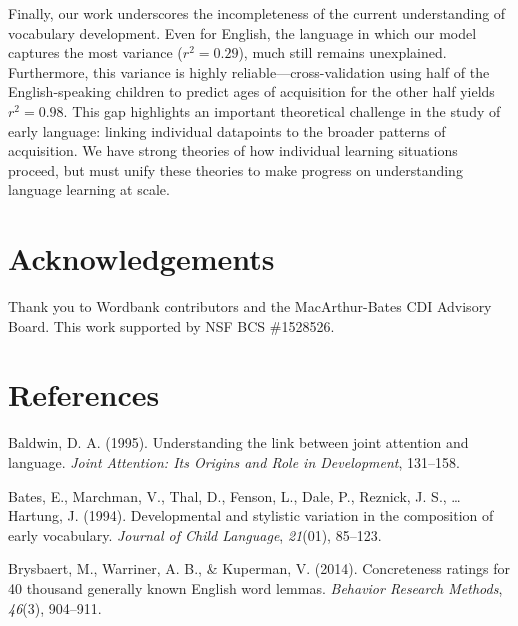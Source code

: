 \documentclass[10pt, letterpaper]{article}
\begin{document}
Finally, our work underscores the incompleteness of the current
understanding of vocabulary development. Even for English, the language
in which our model captures the most variance (\(r^2 = 0.29\)), much
still remains unexplained. Furthermore, this variance is highly
reliable---cross-validation using half of the English-speaking children
to predict ages of acquisition for the other half yields \(r^2 = 0.98\).
This gap highlights an important theoretical challenge in the study of
early language: linking individual datapoints to the broader patterns of
acquisition. We have strong theories of how individual learning
situations proceed, but must unify these theories to make progress on
understanding language learning at scale.

\vspace{1em}

\vspace{1em}

\section{Acknowledgements}\label{acknowledgements}

Thank you to Wordbank contributors and the MacArthur-Bates CDI Advisory
Board. This work supported by NSF BCS \#1528526.

\newpage

\section{References}\label{references}

\setlength{\parindent}{-0.1in} \setlength{\leftskip}{0.125in} \noindent

Baldwin, D. A. (1995). Understanding the link between joint attention
and language. \emph{Joint Attention: Its Origins and Role in
Development}, 131--158.

Bates, E., Marchman, V., Thal, D., Fenson, L., Dale, P., Reznick, J. S.,
\ldots{} Hartung, J. (1994). Developmental and stylistic variation in
the composition of early vocabulary. \emph{Journal of Child Language},
\emph{21}(01), 85--123.

Brysbaert, M., Warriner, A. B., \& Kuperman, V. (2014). Concreteness
ratings for 40 thousand generally known English word lemmas.
\emph{Behavior Research Methods}, \emph{46}(3), 904--911.
\end{document}
